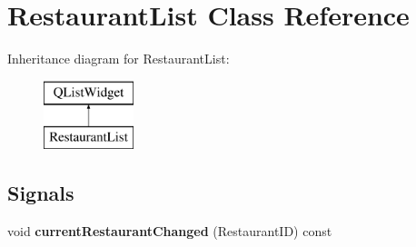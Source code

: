 \hypertarget{classRestaurantList}{\section{Restaurant\-List Class Reference}
\label{classRestaurantList}
}
Inheritance diagram for Restaurant\-List\-:\begin{figure}[H]
\begin{center}
\leavevmode
\includegraphics[height=2.000000cm]{classRestaurantList}
\end{center}
\end{figure}
\subsection*{Signals}
\begin{DoxyCompactItemize}
\item 
\hypertarget{classRestaurantList_a288c89af96c8ac2c537b51f8d8a565ed}{void {\bfseries current\-Restaurant\-Changed} (Restaurant\-I\-D) const }\label{classRestaurantList_a288c89af96c8ac2c537b51f8d8a565ed}

\end{DoxyCompactItemize}
